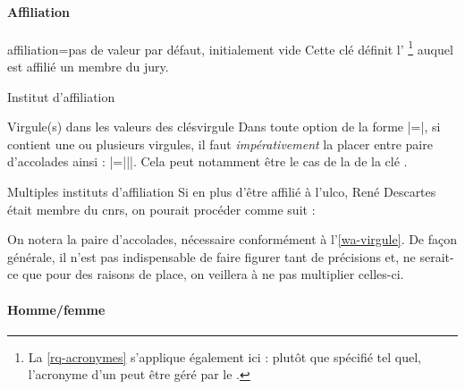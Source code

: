 \paragraph{Affiliation}
\label{sec-inst-de-prov}%
%
%

\begin{docKey}{affiliation}{=}{pas de valeur par défaut,
    initialement vide}
  Cette clé définit l'%
  \footnote{La \vref{rq-acronymes} s'applique également ici : plutôt que
    spécifié tel quel, l'acronyme d'un  peut être géré par le
    .}  auquel est affilié un membre du jury.
\end{docKey}
\begin{dbexample}{Institut d'affiliation}{}
\begin{preamblecode}[listing options={deletekeywords={[5]supervisor}}]
\end{preamblecode}
\end{dbexample}
%
\begin{dbwarning}{Virgule(s) dans les valeurs des clés}{virgule}
  Dans toute option de la forme |=|, si 
  contient une ou plusieurs virgules, il faut \emph{impérativement} la placer
  entre paire d'accolades ainsi : |={||}|. Cela peut
  notamment être le cas de la  de la clé .
\end{dbwarning}
%
\begin{dbexample}{Multiples instituts d'affiliation}{}
  Si en plus d'être affilié à l'\gls{ulco}, René Descartes était membre du
  \gls{cnrs}, on pourait procéder comme suit :
\begin{preamblecode}
\end{preamblecode}
On notera la paire d'accolades, nécessaire conformément
à l'\vref{wa-virgule}. De façon générale, il n'est pas indispensable de faire
figurer tant de précisions et, ne serait-ce que pour des raisons de place, on
veillera à ne pas multiplier celles-ci.
\end{dbexample}

\paragraph{Homme/femme}
\label{sec-hommefemme}%
%
%

